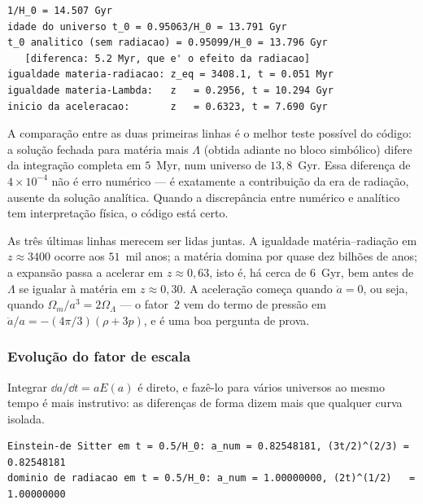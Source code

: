\begin{saida}
\begin{lstlisting}[style=rgsaida]
1/H_0 = 14.507 Gyr
idade do universo t_0 = 0.95063/H_0 = 13.791 Gyr
t_0 analitico (sem radiacao) = 0.95099/H_0 = 13.796 Gyr
   [diferenca: 5.2 Myr, que e' o efeito da radiacao]
igualdade materia-radiacao: z_eq = 3408.1, t = 0.051 Myr
igualdade materia-Lambda:   z   = 0.2956, t = 10.294 Gyr
inicio da aceleracao:       z   = 0.6323, t = 7.690 Gyr
\end{lstlisting}
\end{saida}

\begin{central}
A comparação entre as duas primeiras linhas é o melhor teste possível do
código: a solução fechada para matéria mais $\Lambda$ (obtida adiante no
bloco simbólico) difere da integração completa em $5$~Myr, num universo de
$13{,}8$~Gyr. Essa diferença de $4\times 10^{-4}$ não é erro numérico --- é
exatamente a contribuição da era de radiação, ausente da solução analítica.
Quando a discrepância entre numérico e analítico tem interpretação física,
o código está certo.
\end{central}

As três últimas linhas merecem ser lidas juntas. A igualdade
matéria--radiação em $z \approx 3400$ ocorre aos $51$~mil anos; a matéria
domina por quase dez bilhões de anos; a expansão passa a acelerar em
$z \approx 0{,}63$, isto é, há cerca de $6$~Gyr, bem antes de $\Lambda$ se
igualar à matéria em $z \approx 0{,}30$. A aceleração começa quando
$\ddot a = 0$, ou seja, quando $\Omega_{m}/a^{3} = 2\Omega_{\Lambda}$ --- o
fator~$2$ vem do termo de pressão em
$\ddot a/a = -(4\pi/3)(\rho + 3p)$, e é uma boa pergunta de prova.

\subsubsection*{Evolução do fator de escala}

Integrar $\dd a/\dd t = a E(a)$ é direto, e fazê-lo para vários universos ao
mesmo tempo é mais instrutivo: as diferenças de forma dizem mais que qualquer
curva isolada.

\begin{saida}
\begin{lstlisting}[style=rgsaida]
Einstein-de Sitter em t = 0.5/H_0: a_num = 0.82548181, (3t/2)^(2/3) = 0.82548181
dominio de radiacao em t = 0.5/H_0: a_num = 1.00000000, (2t)^(1/2)   = 1.00000000
\end{lstlisting}
\end{saida}

